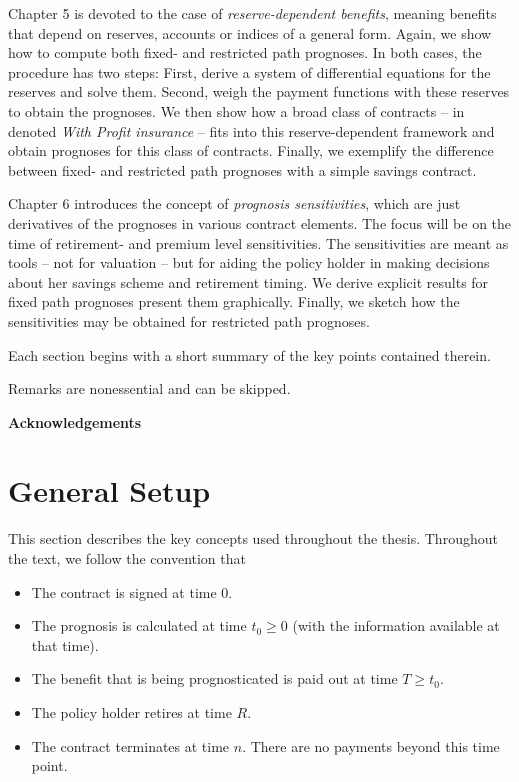 \documentclass{article}
\newcommand{\1}[1]{\mathbbm{1}_{\left\lbrace #1 \right\rbrace}}
\theoremstyle{break}
\theoremstyle{remark}
\numberwithin{equation}{section}
\begin{document}
Chapter 5 is devoted to the case of \textit{reserve-dependent benefits}, meaning benefits that depend on reserves, accounts or indices of a general form. Again, we show how to compute both fixed- and restricted path prognoses. In both cases, the procedure has two steps: First, derive a system of differential equations for the reserves and solve them. Second, weigh the payment functions with these reserves to obtain the prognoses. We then show how a broad class of contracts -- in \cite{Liv2Bog} denoted \textit{With Profit insurance} -- fits into this reserve-dependent framework and obtain prognoses for this class of contracts. Finally, we exemplify the difference between fixed- and restricted path prognoses with a simple savings contract.

Chapter 6 introduces the concept of \textit{prognosis sensitivities}, which are just derivatives of the prognoses in various contract elements. The focus will be on the time of retirement- and premium level sensitivities. The sensitivities are meant as tools -- not for valuation -- but for aiding the policy holder in making decisions about her savings scheme and retirement timing. We derive explicit results for fixed path prognoses present them graphically. Finally, we sketch how the sensitivities may be obtained for restricted path prognoses.

Each section begins with a short summary of the key points contained therein.

Remarks are nonessential and can be skipped.

\textbf{Acknowledgements}

\newpage

\section{General Setup}

This section describes the key concepts used throughout the thesis. Throughout the text, we follow the convention that 

\begin{itemize}
	\item The contract is signed at time $0$.
	\item The prognosis is calculated at time $t_0 \geq 0$ (with the information available at that time).
	\item The benefit that is being prognosticated is paid out at time $T \geq t_0$.
	\item The policy holder retires at time $R$.
	\item The contract terminates at time $n$. There are no payments beyond this time point.
\end{itemize}
\end{document}
